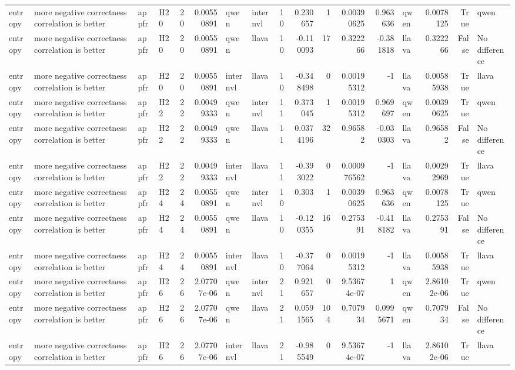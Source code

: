 \begin{longtable}{llllrrllrrrrrlrrl}
entropy & more negative correctness correlation is better & appfr & H20 & 20 & 0.00550891 & qwen & internvl & 10 & 0.230657 & 1 & 0.00390625 & 0.963636 & qwen & 0.0078125 & True & qwen \\
entropy & more negative correctness correlation is better & appfr & H20 & 20 & 0.00550891 & qwen & llava & 10 & -0.110093 & 17 & 0.322266 & -0.381818 & llava & 0.322266 & False & No difference \\
entropy & more negative correctness correlation is better & appfr & H20 & 20 & 0.00550891 & internvl & llava & 10 & -0.348498 & 0 & 0.00195312 & -1 & llava & 0.00585938 & True & llava \\
entropy & more negative correctness correlation is better & appfr & H22 & 22 & 0.00499333 & qwen & internvl & 11 & 0.373045 & 1 & 0.00195312 & 0.969697 & qwen & 0.00390625 & True & qwen \\
entropy & more negative correctness correlation is better & appfr & H22 & 22 & 0.00499333 & qwen & llava & 11 & 0.0374196 & 32 & 0.96582 & -0.030303 & llava & 0.96582 & False & No difference \\
entropy & more negative correctness correlation is better & appfr & H22 & 22 & 0.00499333 & internvl & llava & 11 & -0.393022 & 0 & 0.000976562 & -1 & llava & 0.00292969 & True & llava \\
entropy & more negative correctness correlation is better & appfr & H24 & 24 & 0.00550891 & qwen & internvl & 10 & 0.303 & 1 & 0.00390625 & 0.963636 & qwen & 0.0078125 & True & qwen \\
entropy & more negative correctness correlation is better & appfr & H24 & 24 & 0.00550891 & qwen & llava & 10 & -0.120355 & 16 & 0.275391 & -0.418182 & llava & 0.275391 & False & No difference \\
entropy & more negative correctness correlation is better & appfr & H24 & 24 & 0.00550891 & internvl & llava & 10 & -0.377064 & 0 & 0.00195312 & -1 & llava & 0.00585938 & True & llava \\
entropy & more negative correctness correlation is better & appfr & H26 & 26 & 2.07707e-06 & qwen & internvl & 21 & 0.921657 & 0 & 9.53674e-07 & 1 & qwen & 2.86102e-06 & True & qwen \\
entropy & more negative correctness correlation is better & appfr & H26 & 26 & 2.07707e-06 & qwen & llava & 21 & 0.0591565 & 104 & 0.707934 & 0.0995671 & qwen & 0.707934 & False & No difference \\
entropy & more negative correctness correlation is better & appfr & H26 & 26 & 2.07707e-06 & internvl & llava & 21 & -0.985549 & 0 & 9.53674e-07 & -1 & llava & 2.86102e-06 & True & llava \\

\end{longtable}

